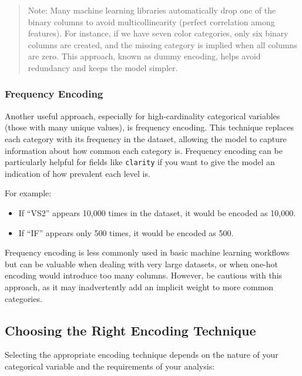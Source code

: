 \documentclass[
]{book}
\newcommand{\passthrough}[1]{#1}
\providecommand{\tightlist}{%
  \setlength{\itemsep}{0pt}\setlength{\parskip}{0pt}}
\theoremstyle{definition}
\theoremstyle{definition}
\theoremstyle{definition}
\theoremstyle{definition}
\theoremstyle{remark}
\begin{document}
\begin{quote}
Note: Many machine learning libraries automatically drop one of the binary columns to avoid multicollinearity (perfect correlation among features). For instance, if we have seven color categories, only six binary columns are created, and the missing category is implied when all columns are zero. This approach, known as dummy encoding, helps avoid redundancy and keeps the model simpler.
\end{quote}

\subsubsection*{Frequency Encoding}\label{frequency-encoding}

Another useful approach, especially for high-cardinality categorical variables (those with many unique values), is frequency encoding. This technique replaces each category with its frequency in the dataset, allowing the model to capture information about how common each category is. Frequency encoding can be particularly helpful for fields like \passthrough{\lstinline!clarity!} if you want to give the model an indication of how prevalent each level is.

For example:

\begin{itemize}
\tightlist
\item
  If ``VS2'' appears 10,000 times in the dataset, it would be encoded as 10,000.
\item
  If ``IF'' appears only 500 times, it would be encoded as 500.
\end{itemize}

Frequency encoding is less commonly used in basic machine learning workflows but can be valuable when dealing with very large datasets, or when one-hot encoding would introduce too many columns. However, be cautious with this approach, as it may inadvertently add an implicit weight to more common categories.

\subsection{Choosing the Right Encoding Technique}\label{choosing-the-right-encoding-technique}

Selecting the appropriate encoding technique depends on the nature of your categorical variable and the requirements of your analysis:
\end{document}
